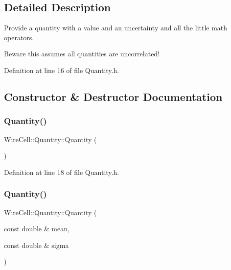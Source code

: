 \subsection{Detailed Description}
Provide a quantity with a value and an uncertainty and all the little math operators.

Beware this assumes all quantities are uncorrelated! 

Definition at line 16 of file Quantity.\+h.



\subsection{Constructor \& Destructor Documentation}
\mbox{\label{class_wire_cell_1_1_quantity_afac627efec0b3e5085d7ad37d9edc45c}} 
\subsubsection{\texorpdfstring{Quantity()}{Quantity()}\hspace{0.1cm}{\footnotesize\ttfamily [1/5]}}
{\footnotesize\ttfamily Wire\+Cell\+::\+Quantity\+::\+Quantity (\begin{DoxyParamCaption}{ }\end{DoxyParamCaption})\hspace{0.3cm}{\ttfamily [inline]}}



Definition at line 18 of file Quantity.\+h.

\mbox{\label{class_wire_cell_1_1_quantity_a4de6e58367552cea905f558399ea9292}} 
\subsubsection{\texorpdfstring{Quantity()}{Quantity()}\hspace{0.1cm}{\footnotesize\ttfamily [2/5]}}
{\footnotesize\ttfamily Wire\+Cell\+::\+Quantity\+::\+Quantity (\begin{DoxyParamCaption}\item[{const double \&}]{mean,  }\item[{const double \&}]{sigma }\end{DoxyParamCaption})\hspace{0.3cm}{\ttfamily [inline]}}




